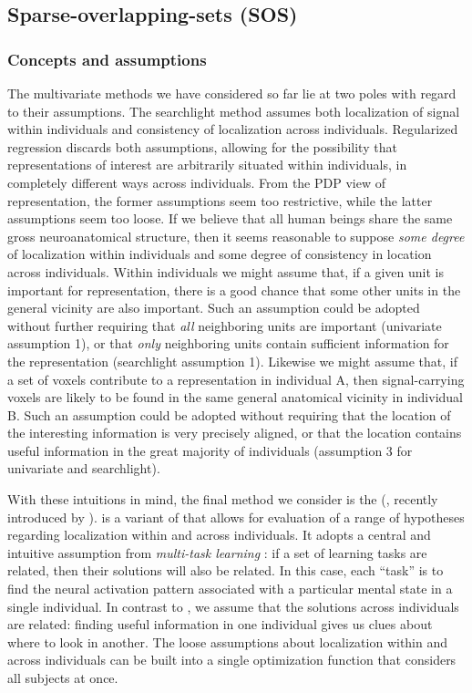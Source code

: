 \subsection{Sparse-overlapping-sets (SOS) {\lasso}}
\subsubsection{Concepts and assumptions}
The multivariate methods we have considered so far lie at two poles with regard to their assumptions. The searchlight method assumes both localization of signal within individuals and consistency of localization across individuals. Regularized regression discards both assumptions, allowing for the possibility that representations of interest are arbitrarily situated within individuals, in completely different ways across individuals. From the PDP view of representation, the former assumptions seem too restrictive, while the latter assumptions seem too loose. If we believe that all human beings share the same gross neuroanatomical structure, then it seems reasonable to suppose {\em some degree} of localization within individuals and some degree of consistency in location across individuals. Within individuals we might assume that, if a given unit is important for representation, there is a good chance that some other units in the general vicinity are also important. Such an assumption could be adopted without further requiring that {\em all} neighboring units are important (univariate assumption 1), or that {\em only} neighboring units contain sufficient information for the representation (searchlight assumption 1). Likewise we might assume that, if a set of voxels contribute to a representation in individual A, then signal-carrying voxels are likely to be found in the same general anatomical vicinity in individual B. Such an assumption could be adopted without requiring that the location of the interesting information is very precisely aligned, or that the location contains useful information in the great majority of individuals (assumption 3 for univariate and searchlight).

With these intuitions in mind, the final method we consider is the {\soslasso} ({\soslassofull}, recently introduced by  ). {\soslasso} is a variant of {\lasso} that allows for evaluation of a range of hypotheses regarding localization within and across individuals. It adopts a central and intuitive assumption from {\em multi-task learning} \cite{Caruana97}: if a set of learning tasks are related, then their solutions will also be related. In this case, each ``task'' is to find the neural activation pattern associated with a particular mental state in a single individual. In contrast to {\lasso}, we assume that the solutions across individuals are related: finding useful information in one individual gives us clues about where to look in another. The loose assumptions about localization within and across individuals can be built into a single optimization function that considers all subjects at once.

